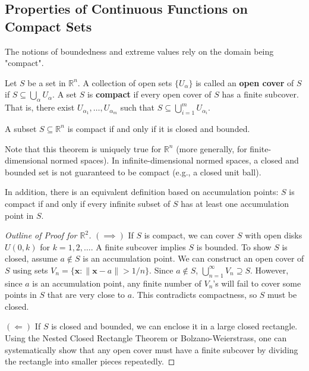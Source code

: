 \subsection{Properties of Continuous Functions on Compact Sets}

The notions of boundedness and extreme values rely on the domain being "compact".

\begin{definition}
Let $S$ be a set in $\mathbb{R}^n$. A collection of open sets $\{U_\alpha\}$ is called an \textbf{open cover} of $S$ if $S \subseteq \bigcup_\alpha U_\alpha$.
A set $S$ is \textbf{compact} if every open cover of $S$ has a finite subcover. That is, there exist $U_{\alpha_1}, \dots, U_{\alpha_m}$ such that $S \subseteq \bigcup_{i=1}^m U_{\alpha_i}$.
\end{definition}

\begin{theorem}
A subset $S \subseteq \mathbb{R}^n$ is compact if and only if it is closed and bounded.
\end{theorem}
\begin{remark}
Note that this theorem is uniquely true for $\mathbb{R}^n$ (more generally, for finite-dimensional normed spaces). In infinite-dimensional normed spaces, a closed and bounded set is not guaranteed to be compact (e.g., a closed unit ball).

In addition, there is an equivalent definition based on accumulation points: $S$ is compact if and only if every infinite subset of $S$ has at least one accumulation point in $S$.
\end{remark}
\begin{proof}[Outline of Proof for $\mathbb{R}^2$]
$(\implies)$ If $S$ is compact, we can cover $S$ with open disks $U(0, k)$ for $k=1,2,\dots$. A finite subcover implies $S$ is bounded. To show $S$ is closed, assume $a \notin S$ is an accumulation point. We can construct an open cover of $S$ using sets $V_n = \{ \mathbf{x} : \|\mathbf{x} - a\| > 1/n \}$. Since $a \notin S$, $\bigcup_{n=1}^\infty V_n \supseteq S$. However, since $a$ is an accumulation point, any finite number of $V_n$'s will fail to cover some points in $S$ that are very close to $a$. This contradicts compactness, so $S$ must be closed.

$(\Longleftarrow)$ If $S$ is closed and bounded, we can enclose it in a large closed rectangle. Using the Nested Closed Rectangle Theorem or Bolzano-Weierstrass, one can systematically show that any open cover must have a finite subcover by dividing the rectangle into smaller pieces repeatedly.
\end{proof}

